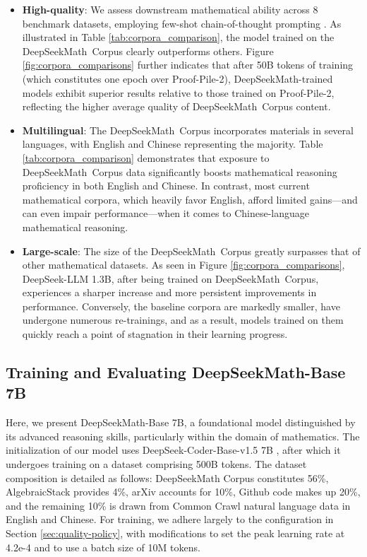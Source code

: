 \begin{itemize}[topsep=0pt]
    \item \textbf{High-quality}:
    We assess downstream mathematical ability across 8 benchmark datasets, employing few-shot chain-of-thought prompting \cite{cot}. As illustrated in Table \ref{tab:corpora_comparison}, the model trained on the DeepSeekMath~Corpus clearly outperforms others. Figure \ref{fig:corpora_comparisons} further indicates that after 50B tokens of training (which constitutes one epoch over Proof-Pile-2), DeepSeekMath-trained models exhibit superior results relative to those trained on Proof-Pile-2, reflecting the higher average quality of DeepSeekMath~Corpus content.
    \item \textbf{Multilingual}:
    The DeepSeekMath~Corpus incorporates materials in several languages, with English and Chinese representing the majority. Table \ref{tab:corpora_comparison} demonstrates that exposure to DeepSeekMath~Corpus data significantly boosts mathematical reasoning proficiency in both English and Chinese. In contrast, most current mathematical corpora, which heavily favor English, afford limited gains—and can even impair performance—when it comes to Chinese-language mathematical reasoning.
    \item \textbf{Large-scale}:
    The size of the DeepSeekMath~Corpus greatly surpasses that of other mathematical datasets. As seen in Figure \ref{fig:corpora_comparisons}, DeepSeek-LLM 1.3B, after being trained on DeepSeekMath~Corpus, experiences a sharper increase and more persistent improvements in performance. Conversely, the baseline corpora are markedly smaller, have undergone numerous re-trainings, and as a result, models trained on them quickly reach a point of stagnation in their learning progress.
\end{itemize}

\subsection{Training and Evaluating DeepSeekMath-Base 7B}

Here, we present DeepSeekMath-Base 7B, a foundational model distinguished by its advanced reasoning skills, particularly within the domain of mathematics. The initialization of our model uses DeepSeek-Coder-Base-v1.5 7B \citep{deepseek-coder}, after which it undergoes training on a dataset comprising 500B tokens. The dataset composition is detailed as follows: DeepSeekMath Corpus constitutes 56\%, AlgebraicStack provides 4\%, arXiv accounts for 10\%, Github code makes up 20\%, and the remaining 10\% is drawn from Common Crawl natural language data in English and Chinese. For training, we adhere largely to the configuration in Section \ref{sec:quality-policy}, with modifications to set the peak learning rate at 4.2e-4 and to use a batch size of 10M tokens.

